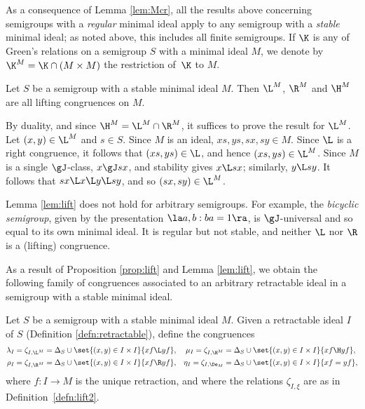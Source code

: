 As a consequence of Lemma \ref{lem:Mcr}, all the results above concerning semigroups with a \emph{regular} minimal ideal apply to any semigroup with a \emph{stable} minimal ideal; as noted above, this includes all finite semigroups.
%
If $\K$ is any of Green's relations on a semigroup $S$ with a minimal ideal $M$, we denote by ${\K^M}={\K}\cap(M\times M)$ the restriction of~$\K$ to $M$.

\begin{lemma}\label{lem:lift}
Let $S$ be a semigroup with a stable minimal ideal $M$.  Then $\L^M$, $\R^M$ and $\H^M$ are all lifting congruences on $M$.
\end{lemma}

\pf By duality, and since ${\H^M}={\L^M}\cap{\R^M}$, it suffices to prove the
result for $\L^M$.  Let $(x,y)\in{\L^M}$ and $s\in S$.  Since $M$ is an ideal,
$xs,ys,sx,sy\in M$.  Since $\L$ is a right congruence, it follows that
$(xs,ys)\in{\L}$, and hence $(xs,ys)\in{\L^M}$.  Since $M$ is a single
$\gJ$-class, $x\gJ sx$, and stability gives $x\L sx$; similarly, $y\L sy$.  It
follows that $sx\L x\L y\L sy$, and so $(sx,sy)\in{\L^M}$. \epf

Lemma \ref{lem:lift} does not hold for arbitrary semigroups.  For example, the \emph{bicyclic semigroup}, given by the presentation $\la a,b:ba=1\ra$, is $\gJ$-universal and so equal to its own minimal ideal.  It is regular but not stable, and neither $\L$ nor $\R$ is a (lifting) congruence.

As a result of Proposition \ref{prop:lift} and Lemma \ref{lem:lift}, we obtain
the following family of congruences associated to an arbitrary retractable
ideal in a semigroup with a stable minimal ideal.

\begin{defn}
\label{defn:lrmI}
Let $S$ be a semigroup with a stable minimal ideal $M$.  Given a retractable ideal $I$ of $S$ (Definition \ref{defn:retractable}), define the congruences
\begin{align*}
\lambda_I=\zeta_{I,{\L^M}}&=\Delta_S\cup\set{ (x,y)\in I\times I}{ xf\L yf},
  &\mu_I=\zeta_{I,{\H^M}}&=\Delta_S\cup\set{ (x,y)\in I\times I}{ xf\H yf},\\
%
\rho_I=\zeta_{I,{\R^M}}&=\Delta_S\cup\set{ (x,y)\in I\times I}{ xf\R yf},
  &\eta_I=\zeta_{I,\De_M}&=\Delta_S\cup\set{ (x,y)\in I\times I}{ xf= yf},
\end{align*}
where $f:I\to M$ is the unique retraction, and where the relations $\zeta_{I,\xi}$ are as in Definition~\ref{defn:lift2}.
\end{defn}

